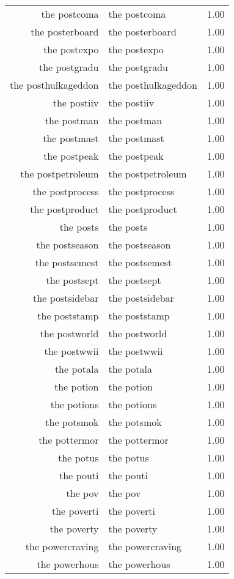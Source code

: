 \begin{table}[ht]
\begin{tabular}{rlr}
  the postcoma & the postcoma & 1.00 \\ 
  the posterboard & the posterboard & 1.00 \\ 
  the postexpo & the postexpo & 1.00 \\ 
  the postgradu & the postgradu & 1.00 \\ 
  the posthulkageddon & the posthulkageddon & 1.00 \\ 
  the postiiv & the postiiv & 1.00 \\ 
  the postman & the postman & 1.00 \\ 
  the postmast & the postmast & 1.00 \\ 
  the postpeak & the postpeak & 1.00 \\ 
  the postpetroleum & the postpetroleum & 1.00 \\ 
  the postprocess & the postprocess & 1.00 \\ 
  the postproduct & the postproduct & 1.00 \\ 
  the posts & the posts & 1.00 \\ 
  the postseason & the postseason & 1.00 \\ 
  the postsemest & the postsemest & 1.00 \\ 
  the postsept & the postsept & 1.00 \\ 
  the postsidebar & the postsidebar & 1.00 \\ 
  the poststamp & the poststamp & 1.00 \\ 
  the postworld & the postworld & 1.00 \\ 
  the postwwii & the postwwii & 1.00 \\ 
  the potala & the potala & 1.00 \\ 
  the potion & the potion & 1.00 \\ 
  the potions & the potions & 1.00 \\ 
  the potsmok & the potsmok & 1.00 \\ 
  the pottermor & the pottermor & 1.00 \\ 
  the potus & the potus & 1.00 \\ 
  the pouti & the pouti & 1.00 \\ 
  the pov & the pov & 1.00 \\ 
  the poverti & the poverti & 1.00 \\ 
  the poverty & the poverty & 1.00 \\ 
  the powercraving & the powercraving & 1.00 \\ 
  the powerhous & the powerhous & 1.00 \\ 

\end{tabular}
\end{table}
